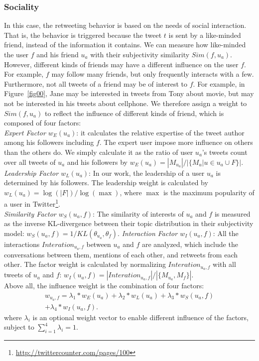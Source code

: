 \documentclass[letterpaper]{article}
\begin{document}
\subsubsection{Sociality}

In this case, the retweeting behavior is based on the needs of social interaction. That is, the behavior is triggered because the tweet $ t $ is sent by a like-minded friend, instead of the information it contains. We can measure how like-minded the user $ f $ and his friend $ u_a $ with their subjectivity similarity $ Sim(f,u_a) $.  However, different kinds of friends may have a different influence on the user $ f $. For example, $ f $ may follow many friends, but only frequently interacts with a few. Furthermore, not all tweets of a friend may be of interest to $ f $. For example, in Figure~\ref{fig00}, Jane may be interested in tweets from Tony about movie, but may not be interested in his tweets about cellphone. We therefore assign a weight to $ Sim(f,u_a) $ to reflect the influence of different kinds of friend, which
is composed of four factors:\\
\emph{Expert Factor $ w_E(u_a) $}: it calculates the relative expertise of the tweet author among his followers including $ f $. The expert user impose more influence on others than the others do. We simply calculate it as the ratio of user $ u_a $'s tweets count over all tweets of $ u_a $ and his followers by $ w_E(u_a)=|M_{u_a}|/|\{M_u|u \in u_a \cup F \}|  $.\\
\emph{Leadership Factor $ w_L(u_a) $}: In our work, the leadership of a user $ u_a $ is determined by his followers. The leadership weight is calculated by $ w_L(u_a)=\log (|F|)/\log(\max) $, where $ \max $ is the maximum popularity of a user in Twitter\footnote{\url{http://twittercounter.com/pages/100}}.\\
\emph{Similarity Factor $ w_S(u_a,f) $}: The similarity of interests of $ u_a $ and $ f $ is measured as the inverse KL-divergence between their topic distribution in their subjectivity model: $ w_S(u_a,f)= 1/KL(\theta_{u_a},\theta_f)$.
\emph{Interaction Factor $ w_I(u_a,f) $}: All the interactions $ Interation_{u_a,f} $ between $ u_a $ and $ f $ are analyzed, which include the conversations between them, mentions of each other, and retweets from each other. The factor weight is calculated by normalizing $Interation_{u_a,f}$ with all tweets of $ u_a $ and $ f $: $ w_I(u_a,f)=|Interation_{u_a,f}| /|\{ M_{u_a}, M_f \}| $.\\
Above all, the influence weight is the combination of four factors:
\begin{equation}
\begin{split}
w_{u_a,f}=\lambda_1*w_E(u_a)+\lambda_2*w_L(u_a)+\lambda_3*w_S(u_a,f)\\+\lambda_4*w_I(u_a,f). 
\end{split}
\end{equation}
where $ \lambda_i $ is an optional weight vector to enable different influence of the factors,  subject to $ \sum_{i=1}^{4}\lambda_i=1 $.
\end{document}
